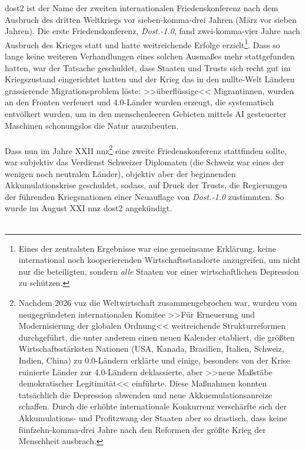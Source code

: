 \ac{dost2} ist der Name der zweiten internationalen
Friedenskonferenz nach dem Ausbruch des dritten Weltkriegs vor sieben-komma-drei
Jahren (März vor sieben Jahren).
Die erste Friedenskonferenz, \emph{Dost.-1.0}, fand zwei-komma-vier Jahre nach
Ausbruch des Krieges statt und hatte weitreichende Erfolge erzielt\footnote{
  Eines der zentralsten Ergebnisse war eine gemeinsame Erklärung, keine
  international noch kooperierenden Wirtschaftsstandorte anzugreifen, um nicht
  nur die beteiligten, sondern \emph{alle} Staaten vor einer wirtschaftlichen
  Depression zu schützen.
}.
Dass so lange keine weiteren Verhandlungen eines solchen Ausmaßes mehr
stattgefunden hatten, war der Tatsache geschuldet, dass Staaten und Trusts sich
recht gut im Kriegszustand eingerichtet hatten und der Krieg das in den
nullte-Welt Ländern grassierende Migrationsproblem löste: >>überflüssige<<
Migrantinnen, wurden an den Fronten verfeuert und 4.0-Länder wurden
erzeugt, die systematisch entvölkert wurden, um in den menschenleeren Gebieten
mittels AI gesteuerter Maschinen schonungslos die Natur auszubeuten.\\\\
Dass nun im Jahre XXII \ac{nnz}\footnote{
  Nachdem 2026 \ac{vuz} die Weltwirtschaft zusammengebrochen war, wurden vom
  neugegründeten internationalen Komitee >>Für Erneuerung und Modernisierung der
  globalen Ordnung<< weitreichende Strukturreformen durchgeführt, die
  unter anderem einen neuen Kalender etabliert, die größten
  Wirtschaftsstärksten Nationen (USA, Kanada, Brasilien, Italien, Schweiz,
  Indien, China) zu 0.0-Ländern erklärte und einige, besonders
  von der Krise ruinierte Länder zur 4.0-Ländern deklassierte, aber >>neue
  Maßstäbe demokratischer Legitimität<< einführte.
  Diese Maßnahmen konnten tatsächlich die Depression abwenden und neue
  Akkuemulationsanreize schaffen. 
  Durch die erhöhte internationale Konkurrenz verschärfte sich der
  Akkumulations- und Profitzwang der Staaten aber so drastisch, dass keine
  fünfzehn-komma-drei Jahre nach den Reformen der größte Krieg der Menschheit
  ausbrach.
} eine zweite Friedenskonferenz stattfinden sollte, war subjektiv das Verdienst
Schweizer Diplomaten (die Schweiz war eines der wenigen noch neutralen Länder),
objektiv aber der beginnenden Akkumulationskrise geschuldet, sodass, auf Druck
der Trusts, die Regierungen der führenden Kriegsnationen einer Neuauflage von
\emph{Dost.-1.0} zustimmten. 
So wurde im August XXI \ac{nnz} \ac{dost2} angekündigt.\\\\
